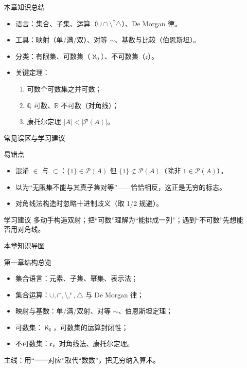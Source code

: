 \documentclass[aspectratio=169,11pt]{ctexbeamer}
\begin{document}
\begin{frame}{本章知识总结}
  \begin{itemize}
    \item \alert{语言}：集合、子集、运算（$\cup\cap\setminus^{c}\triangle$）、De Morgan 律。
    \item \alert{工具}：映射（单/满/双）、对等 $\sim$、基数与比较（伯恩斯坦）。
    \item \alert{分类}：有限集、可数集（$\aleph_{0}$）、不可数集（$\mathfrak{c}$）。
    \item \alert{关键定理}：
      \begin{enumerate}
        \item 可数个可数集之并可数；
        \item $\mathbb{Q}$ 可数、$\mathbb{R}$ 不可数（对角线）；
        \item 康托尔定理 $|A|<|\mathcal{P}(A)|$。
      \end{enumerate}
  \end{itemize}
\end{frame}

\begin{frame}{常见误区与学习建议}
  \begin{block}{易错点}
    \begin{itemize}
      \item 混淆 $\in$ 与 $\subset$：$\{1\}\in\mathcal{P}(A)$ 但 $\{1\}\not\subset\mathcal{P}(A)$（除非 $1\in\mathcal{P}(A)$）。
      \item 以为“无限集不能与其真子集对等”——恰恰相反，这正是无穷的标志。
      \item 对角线法构造时忽略十进制歧义（取 1/2 规避）。
    \end{itemize}
  \end{block}
  \begin{block}{学习建议}
    多动手构造双射；把“可数”理解为“能排成一列”；遇到“不可数”先想能否用对角线。
  \end{block}
\end{frame}

\begin{frame}{本章知识导图}
  \begin{block}{第一章结构总览}
    \begin{itemize}
      \item \alert{集合语言}：元素、子集、幂集、表示法；
      \item \alert{集合运算}：$\cup,\cap,\setminus,^{c},\triangle$ 与 De Morgan 律；
      \item \alert{映射与基数}：单/满/双射、对等 $\sim$、伯恩斯坦定理；
      \item \alert{可数集}：$\aleph_{0}$，可数集的运算封闭性；
      \item \alert{不可数集}：$\mathfrak{c}$，对角线法、康托尔定理。
    \end{itemize}
  \end{block}
  \begin{center}
    \color{cloudgray}\small 主线：用“一一对应”取代“数数”，把无穷纳入算术。
  \end{center}
\end{frame}
\end{document}
